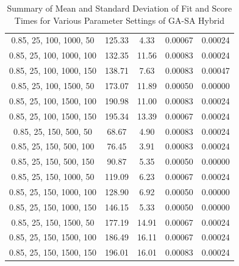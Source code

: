 \documentclass{article}
\begin{document}
\begin{table}[H]
{\begin{tabular}{|c|c|c|c|c|}
                0.85, 25, 100, 1000, 50    & 125.33                 & 4.33                  & 0.00067                  & 0.00024                 \\
                0.85, 25, 100, 1000, 100   & 132.35                 & 11.56                 & 0.00083                  & 0.00024                 \\
                0.85, 25, 100, 1000, 150   & 138.71                 & 7.63                  & 0.00083                  & 0.00047                 \\
                0.85, 25, 100, 1500, 50    & 173.07                 & 11.89                 & 0.00050                  & 0.00000                 \\
                0.85, 25, 100, 1500, 100   & 190.98                 & 11.00                 & 0.00083                  & 0.00024                 \\
                0.85, 25, 100, 1500, 150   & 195.34                 & 13.39                 & 0.00067                  & 0.00024                 \\
                0.85, 25, 150, 500, 50     & 68.67                  & 4.90                  & 0.00083                  & 0.00024                 \\
                0.85, 25, 150, 500, 100    & 76.45                  & 3.91                  & 0.00083                  & 0.00024                 \\
                0.85, 25, 150, 500, 150    & 90.87                  & 5.35                  & 0.00050                  & 0.00000                 \\
                0.85, 25, 150, 1000, 50    & 119.09                 & 6.23                  & 0.00067                  & 0.00024                 \\
                0.85, 25, 150, 1000, 100   & 128.90                 & 6.92                  & 0.00050                  & 0.00000                 \\
                0.85, 25, 150, 1000, 150   & 146.15                 & 5.33                  & 0.00050                  & 0.00000                 \\
                0.85, 25, 150, 1500, 50    & 177.19                 & 14.91                 & 0.00067                  & 0.00024                 \\
                0.85, 25, 150, 1500, 100   & 186.49                 & 16.11                 & 0.00067                  & 0.00024                 \\
                0.85, 25, 150, 1500, 150   & 196.01                 & 16.01                 & 0.00083                  & 0.00024                 \\
                \hline
            \end{tabular}
        }
        \caption{Summary of Mean and Standard Deviation of Fit and Score Times for Various Parameter Settings of GA-SA Hybrid}
        \label{tab:gasa_summary_fit_score_times}
    \end{table}
\end{document}
